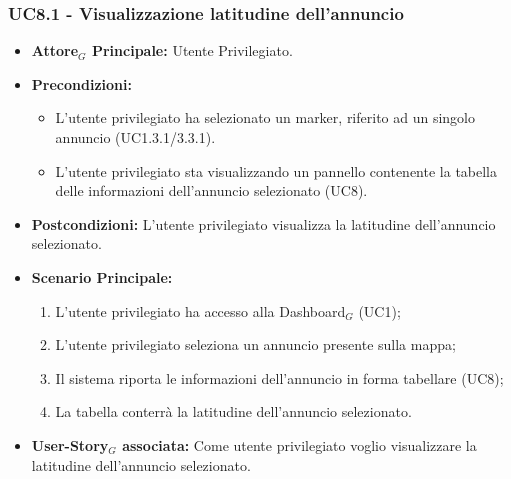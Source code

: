 \documentclass[11pt]{article}
\begin{document}
\begin{justify}
 \subsubsection{\textbf{UC8.1 - Visualizzazione latitudine dell'annuncio}}
 \begin{itemize}
     \item \textbf{Attore$_G$ Principale:} Utente Privilegiato.
     \item \textbf{Precondizioni:}
       \begin{itemize}
    	        \item L'utente privilegiato ha selezionato un marker, riferito ad un singolo annuncio (UC1.3.1/3.3.1).
          \item L'utente privilegiato sta visualizzando un pannello contenente la tabella delle informazioni dell'annuncio selezionato (UC8).
       \end{itemize}
     \item \textbf{Postcondizioni:} L'utente privilegiato visualizza la latitudine dell'annuncio selezionato.
     \item \textbf{Scenario Principale:}
        \begin{enumerate}
            \item L'utente privilegiato ha accesso alla Dashboard$_G$ (UC1);
            \item L'utente privilegiato seleziona un annuncio presente sulla mappa;
            \item Il sistema riporta le informazioni dell'annuncio in forma tabellare (UC8);
            \item La tabella conterrà la latitudine dell'annuncio selezionato.
        \end{enumerate}
     \item \textbf{User-Story$_G$ associata:} Come utente privilegiato voglio visualizzare la latitudine dell'annuncio selezionato. 
 \end{itemize}

\end{justify}
\end{document}
